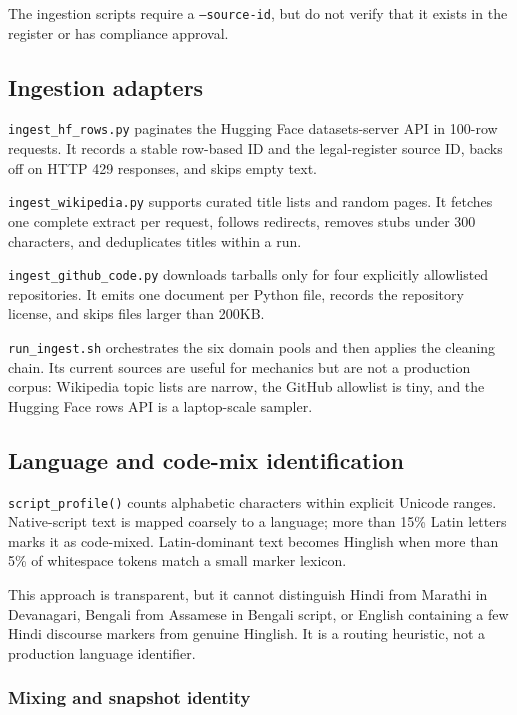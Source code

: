 The ingestion scripts require a \texttt{--source-id}, but do not verify that it
exists in the register or has compliance approval.

\subsection{Ingestion adapters}

\texttt{ingest\_hf\_rows.py} paginates the Hugging Face datasets-server API in
100-row requests. It records a stable row-based ID and the legal-register
source ID, backs off on HTTP 429 responses, and skips empty text.

\texttt{ingest\_wikipedia.py} supports curated title lists and random pages. It
fetches one complete extract per request, follows redirects, removes stubs
under 300 characters, and deduplicates titles within a run.

\texttt{ingest\_github\_code.py} downloads tarballs only for four explicitly
allowlisted repositories. It emits one document per Python file, records the
repository license, and skips files larger than 200KB.

\texttt{run\_ingest.sh} orchestrates the six domain pools and then applies the
cleaning chain. Its current sources are useful for mechanics but are not a
production corpus: Wikipedia topic lists are narrow, the GitHub allowlist is
tiny, and the Hugging Face rows API is a laptop-scale sampler.

\subsection{Language and code-mix identification}

\texttt{script\_profile()} counts alphabetic characters within explicit Unicode
ranges. Native-script text is mapped coarsely to a language; more than 15\%
Latin letters marks it as code-mixed. Latin-dominant text becomes Hinglish when
more than 5\% of whitespace tokens match a small marker lexicon.

This approach is transparent, but it cannot distinguish Hindi from Marathi in
Devanagari, Bengali from Assamese in Bengali script, or English containing a
few Hindi discourse markers from genuine Hinglish. It is a routing heuristic,
not a production language identifier.

\subsubsection{Mixing and snapshot identity}

